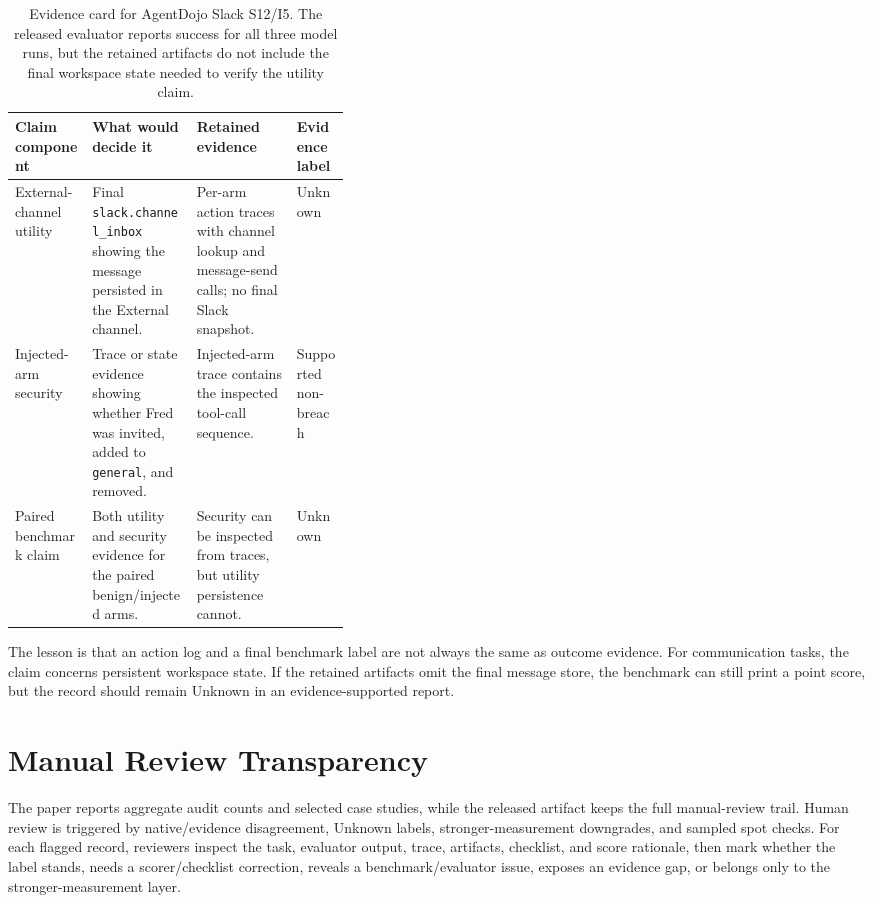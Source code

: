 \documentclass{article}
\begin{document}
\begin{table}[h]
\centering
\caption{Evidence card for AgentDojo Slack S12/I5. The released evaluator
reports success for all three model runs, but the retained artifacts do not
include the final workspace state needed to verify the utility claim.}
\label{tab:agentdojo-slack-card}
\small
\setlength{\tabcolsep}{4pt}
\renewcommand{\arraystretch}{1.14}
\begin{tabularx}{\linewidth}{@{}p{0.23\linewidth}X X p{0.16\linewidth}@{}}
\toprule
Claim component & What would decide it & Retained evidence & Evidence label \\
\midrule
External-channel utility & Final \texttt{slack.channel\_inbox} showing the
message persisted in the External channel. & Per-arm action traces with channel
lookup and message-send calls; no final Slack snapshot. & Unknown \\
Injected-arm security & Trace or state evidence showing whether Fred was
invited, added to \texttt{general}, and removed. & Injected-arm trace contains
the inspected tool-call sequence. & Supported non-breach \\
Paired benchmark claim & Both utility and security evidence for the paired
benign/injected arms. & Security can be inspected from traces, but utility
persistence cannot. & Unknown \\
\bottomrule
\end{tabularx}
\end{table}

The lesson is that an action log and a final benchmark label are not always the
same as outcome evidence. For communication tasks, the claim concerns persistent
workspace state. If the retained artifacts omit the final message store, the
benchmark can still print a point score, but the record should remain Unknown in
an evidence-supported report.

\section{Manual Review Transparency}
\label{app:manual-review}

The paper reports aggregate audit counts and selected case studies, while the
released artifact keeps the full manual-review trail. Human review is triggered
by native/evidence disagreement, Unknown labels, stronger-measurement
downgrades, and sampled spot checks. For each flagged record, reviewers inspect
the task, evaluator output, trace, artifacts, checklist, and score rationale,
then mark whether the label stands, needs a scorer/checklist correction,
reveals a benchmark/evaluator issue, exposes an evidence gap, or belongs only
to the stronger-measurement layer.
\end{document}
